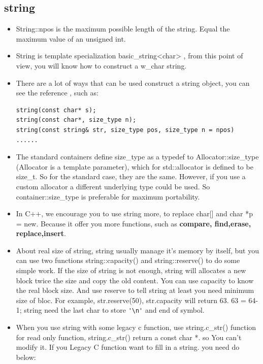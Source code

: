 \documentclass[a4paper,11pt,twoside]{book}
\begin{document}
\subsection{string}
\begin{itemize}
	\item String::npos is the maximum possible length of the string. Equal the maximum value of an unsigned int.
	\item String is template specialization basic\_string<char> , from this point of view, you will know how to construct a w\_char string.
	\item There are a lot of ways that can be used construct a string object, you can see the reference , such as:
\begin{lstlisting}[numbers=none]
string(const char* s);
string(const char*, size_type n);
string(const string& str, size_type pos, size_type n = npos)
......
\end{lstlisting}
	
	\item The standard containers define size\_type as a typedef to Allocator::size\_type (Allocator is a template parameter), which for std::allocator is defined to be size\_t. So for the standard case, they are the same. However, if you use a custom allocator a different underlying type could be used. So container::size\_type is preferable for maximum portability.
	
	\item In C++, we encourage you to use string more, to replace char[] and char *p = new.  Because it offer you more functions, such as\textbf{ compare, find,erase, replace,insert}.
	
	\item About real size of string, string usually manage it's memory by itself, but you can use two functions string::capacity() and string::reserve() to do some simple work. If the size of string is not enough, string will allocates a new block twice the size and copy the old content. You can use capacity to know the real block size. And use reserve to tell string at least you need minimum size of bloc. For example, str.reserve(50),  str.capacity will return 63. 63 = 64-1; string need the last char to store \verb='\n'= and end of symbol.
	
	\item When you use string with some legacy c function, use string.c\_str() function for read only function, string.c\_str() return a const char *. so You can't modify it. If you Legacy C function want to fill in a string. you need do below:
	

\end{itemize}
\end{document}
